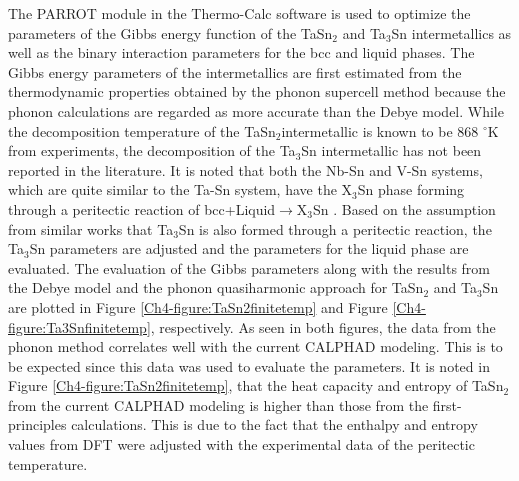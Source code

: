 The PARROT module in the Thermo-Calc software \cite{Andersson2002} is used to optimize the parameters of the Gibbs energy function of the TaSn$_2$ and Ta$_3$Sn intermetallics as well as the binary interaction parameters for the bcc and liquid phases. The Gibbs energy parameters of the intermetallics are first estimated from the thermodynamic properties obtained by the phonon supercell method because the phonon calculations are regarded as more accurate than the Debye model. While the decomposition temperature of the TaSn$_2$intermetallic is known to be 868 $^\circ$K from experiments, the decomposition of the Ta$_3$Sn intermetallic has not been reported in the literature. It is noted that both the Nb-Sn and V-Sn systems, which are quite similar to the Ta-Sn system, have the X$_3$Sn phase forming through a peritectic reaction of bcc+Liquid$\rightarrow$X$_3$Sn \cite{Yue2009,Toffolon2002,Toffolon1998}. Based on the assumption from similar works that Ta$_3$Sn is also formed through a peritectic reaction, the Ta$_3$Sn parameters are adjusted and the parameters for the liquid phase are evaluated. The evaluation of the Gibbs parameters along with the results from the Debye model and the phonon quasiharmonic approach for TaSn$_2$ and Ta$_3$Sn are plotted in Figure \ref{Ch4-figure:TaSn2finitetemp} and Figure \ref{Ch4-figure:Ta3Snfinitetemp}, respectively. As seen in both figures, the data from the phonon method correlates well with the current CALPHAD modeling. This is to be expected since this data was used to evaluate the parameters. It is noted in Figure \ref{Ch4-figure:TaSn2finitetemp}, that the heat capacity and entropy of TaSn$_2$ from the current CALPHAD modeling is higher than those from the first-principles calculations. This is due to the fact that the enthalpy and entropy values from DFT were adjusted with the experimental data of the peritectic temperature.

